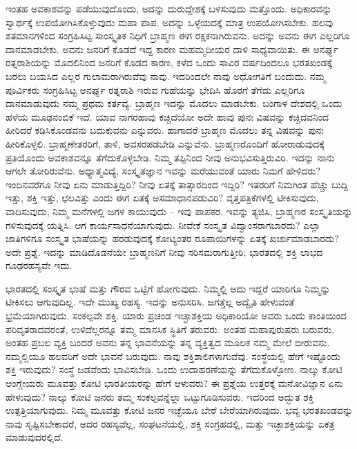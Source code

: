 ಇಂತಹ ಅವಕಾಶವನ್ನು ಪಡೆಯುವುದೊಂದು, ಅದನ್ನು ದುರುದ್ದೇಶಕ್ಕೆ ಬಳಸುವುದು ಮತ್ತೊಂದು. ಅಧಿಕಾರವನ್ನು ಸ್ವಾರ್ಥಕ್ಕೆ ಉಪಯೋಗಿಸಿಕೊಳ್ಳುವುದು ಮಹಾ ಪಾಪ. ಅದನ್ನು ಒಳ್ಳೆಯದಕ್ಕೆ ಮಾತ್ರ ಉಪಯೋಗಿಸಬೇಕು. ಹಲವು ಶತಮಾನಗಳಿಂದ ಸಂಗ್ರಹಿಸಿಟ್ಟ ಸಾಂಸ್ಕೃತಿಕ ನಿಧಿಗೆ ಬ್ರಾಹ್ಮಣ ಈಗ ರಕ್ಷಕನಾಗಿರುವನು. ಅದನ್ನು ಅವನು ಈಗ ಎಲ್ಲರಿಗೂ ದಾನಮಾಡಬೇಕು. ಅವನು ಜನರಿಗೆ ಕೊಡದೆ ಇದ್ದ ಕಾರಣ ಮಹಮ್ಮದೀಯರ ದಾಳಿ ಸಾಧ್ಯವಾಯಿತು. ಈ ಅನರ್ಘ್ಯ ರತ್ನರಾಶಿಯನ್ನು ಮೊದಲಿನಿಂದ ಜನರಿಗೆ ಕೊಡದ ಕಾರಣ, ಕಳೆದ ಒಂದು ಸಾವಿರ ವರ್ಷದಿಂದಲೂ ಭರತಖಂಡಕ್ಕೆ ಬರಲು ಬಯಸಿದ ಎಲ್ಲರ ಗುಲಾಮರಾಗಿರುವೆವು ನಾವು. ಇದರಿಂದಲೇ ನಾವು ಅಧೋಗತಿಗೆ ಬಂದುದು. ನಮ್ಮ ಪೂರ್ವಿಕರು ಸಂಗ್ರಹಿಸಿಟ್ಟ ಅನರ್ಘ್ಯ ರತ್ನರಾಶಿ ಇರುವ ಗುಹೆಯನ್ನು ಭೇದಿಸಿ ಹೊರಗೆ ತೆಗೆದು ಎಲ್ಲರಿಗೂ ದಾನಮಾಡುವುದು ನಮ್ಮ ಪ್ರಥಮ ಕರ್ತವ್ಯ. ಬ್ರಾಹ್ಮಣ ಇದನ್ನು ಮೊದಲು ಮಾಡಬೇಕು. ಬಂಗಾಳ ದೇಶದಲ್ಲಿ ಒಂದು ಹಳೆಯ ಮೂಢನಂಬಿಕೆ ಇದೆ. ಯಾವ ನಾಗರಹಾವು ಕಚ್ಚಿದೆಯೋ ಅದೇ ಹಾವು ಪುನಃ ವಿಷವನ್ನು ಕಚ್ಚಿದವನಿಂದ ಹೀರಿದರೆ ಕಡಿಸಿಕೊಂಡವನು ಬದುಕುವನು ಎನ್ನುವರು. ಹಾಗಾದರೆ ಬ್ರಾಹ್ಮಣ ಮೊದಲು ತನ್ನ ವಿಷವನ್ನು ಪುನಃ ಹೀರಿಕೊಳ್ಳಲಿ. ಬ್ರಾಹ್ಮಣೇತರರಿಗೆ, ತಾಳಿ, ಅವಸರಪಡಬೇಡಿ ಎನ್ನುವೆನು. ಬ್ರಾಹ್ಮಣರೊಂದಿಗೆ ಹೋರಾಡುವುದಕ್ಕೆ ಪ್ರತಿಯೊಂದು ಅವಕಾಶವನ್ನೂ ತೆಗೆದುಕೊಳ್ಳಬೇಡಿ. ನಿಮ್ಮ ತಪ್ಪಿನಿಂದ ನೀವು ಅನುಭವಿಸುತ್ತಿರುವಿರಿ. ಇದನ್ನು ನಾನು ಆಗಲೇ ತೋರಿರುವೆನು. ಅಧ್ಯಾತ್ಮವಿದ್ಯೆ, ಸಂಸ್ಕೃತಜ್ಞಾನ ಇವನ್ನು ಮರೆಯುವಂತೆ ಯಾರು ನಿಮಗೆ ಹೇಳಿದರು? ಇಂದಿನವರೆಗೂ ನೀವು ಏನು ಮಾಡುತ್ತಿದ್ದಿರಿ? ನೀವು ಏತಕ್ಕೆ ತಾತ್ಸಾರದಿಂದ ಇದ್ದಿರಿ? ಇತರರಿಗೆ ನಿಮಗಿಂತ ಹೆಚ್ಚು ಬುದ್ದಿ ಇತ್ತು, ಶಕ್ತಿ ಇತ್ತು, ಛಲವಿತ್ತು ಎಂದು ಈಗ ಏತಕ್ಕೆ ಅಸಮಾಧಾನಪಡುವಿರಿ? ವೃತ್ತಪತ್ರಿಕೆಗಳಲ್ಲಿ ಟೀಕಿಸುವುದು, ವಾದಿಸುವುದು, ನಿಮ್ಮ ಮನೆಗಳಲ್ಲಿ ಜಗಳ ಕಾಯುವುದು – ಇವು ಪಾಪಕರ. ಇವನ್ನು ತ್ಯಜಿಸಿ, ಬ್ರಾಹ್ಮಣರ ಸಂಸ್ಕೃತಿಯನ್ನು ಗಳಿಸುವುದಕ್ಕೆ ಯತ್ನಿಸಿ. ಆಗ ಕಾರ್ಯಸಾಧನೆಯಾಗುವುದು. ನೀವೇಕೆ ಸಂಸ್ಕೃತ ವಿದ್ವಾಂಸರಾಗಬಾರದು? ಎಲ್ಲಾ ಜಾತಿಗಳಿಗೂ ಸಂಸ್ಕೃತ ಭಾಷೆಯನ್ನು ಹರಡುವುದಕ್ಕೆ ಕೋಟ್ಯಂತರ ರೂಪಾಯಿಗಳನ್ನು ಏತಕ್ಕೆ ಖರ್ಚುಮಾಡಬಾರದು? ಅದೇ ಪ್ರಶ್ನೆ. ಇದನ್ನು ಮಾಡಿದೊಡನೆಯೇ ಬ್ರಾಹ್ಮಣನಿಗೆ ನೀವು ಸರಿಸಮರಾಗುತ್ತೀರಿ; ಭಾರತದಲ್ಲಿ ಶಕ್ತಿ ಲಾಭದ ಗೂಢರಹಸ್ಯವೇ ಇದು. 

ಭಾರತದಲ್ಲಿ ಸಂಸ್ಕೃತ ಭಾಷೆ ಮತ್ತು ಗೌರವ ಒಟ್ಟಿಗೆ ಹೋಗುವುದು. ನಿಮ್ಮಲ್ಲಿ ಅದು ಇದ್ದರೆ ಯಾರಿಗೂ ನಿಮ್ಮನ್ನು ಟೀಕಿಸಲು ಆಗುವುದಿಲ್ಲ. ಇದೇ ಮುಖ್ಯ ರಹಸ್ಯ. ಇದನ್ನು ಅನುಸರಿಸಿ. ಜಗತ್ತೆಲ್ಲ ಅದ್ವೈತಿ ಹೇಳುವಂತೆ ಭ್ರಮೆಯಾಗಿರುವುದು. ಸಂಕಲ್ಪವೇ ಶಕ್ತಿ. ಯಾರು ಪ್ರಚಂಡ ಇಚ್ಛಾಶಕ್ತಿಯ ಅಧಿಕಾರಿಯೋ ಅವರು ಒಂದು ಕಾಂತಿಯಿಂದ ಪರಿವೃತರಾದವರಂತೆ, ಉಳಿದೆಲ್ಲರನ್ನೂ ತಮ್ಮ ಮಾನಸಿಕ ಸ್ಥಿತಿಗೆ ತರುವರು. ಅಂತಹ ಮಹಾಪುರುಷರು ಬರುವರು. ಅಂತಹ ಪ್ರಬಲ ವ್ಯಕ್ತಿ ಬಂದರೆ ಅವನು ತನ್ನ ಭಾವನೆಯನ್ನು ತನ್ನ ವ್ಯಕ್ತಿತ್ವದ ಮೂಲಕ ನಮ್ಮ ಮೇಲೆ ಬೀರುವನು. ನಮ್ಮಲ್ಲಿಯೂ ಹಲವರಿಗೆ ಅದೇ ಭಾವನೆ ಬರುವುದು. ನಾವು ಶಕ್ತಿಶಾಲಿಗಳಾಗುವೆವು. ಸಂಸ್ಥೆಯಲ್ಲಿ ಹೇಗೆ ಇಷ್ಟೊಂದು ಶಕ್ತಿ ಇರುವುದು? ಸಂಸ್ಥೆ ಜಡವೆಂದು ಭಾವಿಸಬೇಡಿ. ಒಂದು ಉದಾಹರಣೆಯನ್ನು ತೆಗೆದುಕೊಳ್ಳೋಣ. ನಾಲ್ಕು ಕೋಟಿ ಆಂಗ್ಲೇಯರು ಮೂವತ್ತು ಕೋಟಿ ಭಾರತೀಯರನ್ನು ಹೇಗೆ ಆಳುವರು? ಈ ಪ್ರಶ್ನೆಯ ಉತ್ತರಕ್ಕೆ ಮನೋವಿಜ್ಞಾನ ಏನು ಹೇಳುವುದು? ನಾಲ್ಕು ಕೋಟಿ ಜನರು ತಮ್ಮ ಸಂಕಲ್ಪವನ್ನೆಲ್ಲಾ ಒಟ್ಟುಗೂಡಿಸುವರು. ಇದರಿಂದ ಅದ್ಭುತ ಶಕ್ತಿ ಉತ್ಪತ್ತಿಯಾಗುವುದು. ನಿಮ್ಮ ಮೂವತ್ತು ಕೋಟಿ ಜನರ ಇಚ್ಛೆಯೂ ಬೇರೆ ಬೇರೆಯಾಗಿರುವುದು. ಭವ್ಯ ಭರತಖಂಡವನ್ನು ನಾವು ಸೃಷ್ಟಿಸಬೇಕಾದರೆ, ಅದರ ರಹಸ್ಯವೆಲ್ಲ, ಸಂಘಟನೆಯಲ್ಲಿ, ಶಕ್ತಿ ಸಂಗ್ರಹದಲ್ಲಿ, ಮತ್ತು ಇಚ್ಛಾಶಕ್ತಿಯನ್ನು ಏಕತ್ರ ಮಾಡುವುದರಲ್ಲಿದೆ. 


